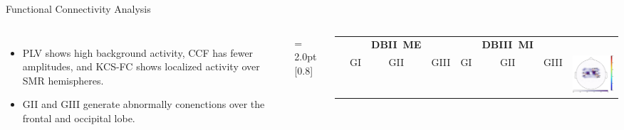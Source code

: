 \documentclass[aspectratio=169]{beamer}
\begin{document}
\begin{frame}{Functional Connectivity Analysis}
    \begin{columns}
            \begin{itemize}
                \item PLV shows high background activity, CCF has fewer amplitudes, and KCS-FC shows localized activity over SMR hemispheres.
                \item GII and GIII generate abnormally conenctions over the frontal and occipital lobe. 
            \end{itemize}
            \def \kerrwidth {0.15\linewidth}
            \tabcolsep = 2.0pt
            \def\arraystretch{1.0}
            \scalebox{0.8}[0.8]{
                \begin{tabular}{cccccccc}
                    \centering
                    & & \textbf{DBII~ME}& & & \textbf{DBIII~MI}&\\
                    \cmidrule{2-7}
                    & {GI} & {GII}&{GIII}&{GI} & {GII}&{GIII}&
                    \multirow{6}{*}{{\includegraphics[trim=660 0 0 0, clip,scale=0.35]{../Tesis_document/Figures/Objective_1/Cxsbj1hg-gaussacc95.28.eps}}}\\

\end{tabular}}
\end{columns}
\end{frame}
\end{document}
